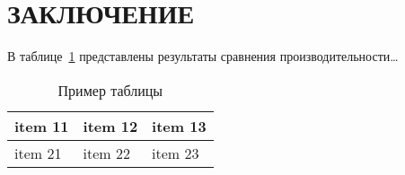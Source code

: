\documentclass{studrep}
\begin{document}
\chapter*{ЗАКЛЮЧЕНИЕ}

В таблице~\ref{tbl:ex} представлены результаты сравнения производительности\ldots

\begin{table}[hb]
  \caption{Пример таблицы}\label{tbl:ex}
  \centering
\begin{tabularx}{1\textwidth} {
  | >{\raggedright\arraybackslash}X
  | >{\centering\arraybackslash}X
  | >{\raggedleft\arraybackslash}X | }
 \hline
 item 11 & item 12 & item 13 \\
 \hline
 item 21  & item 22  & item 23  \\
\hline
\end{tabularx}
\end{table}
\end{document}
